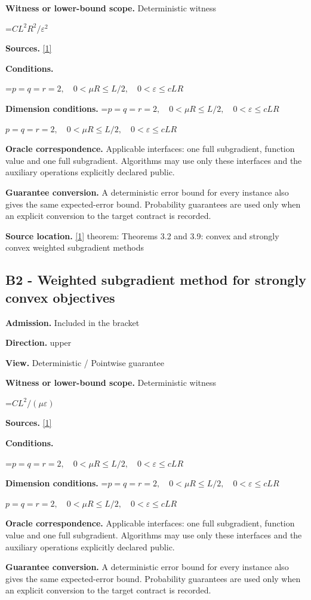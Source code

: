 \documentclass[10pt,a4paper]{article}
\newcommand{\AtlasMath}[1]{\par\begingroup\centering\setbox0=\hbox{$\displaystyle #1$}\ifdim\wd0>1.4\linewidth\typeout{ATLAS WIDE FORMULA: \the\wd0}\fi\ifdim\wd0>\linewidth\resizebox{\linewidth}{!}{\box0}\else\box0\fi\par\endgroup}
\newcommand{\AtlasInlineMath}[1]{\begingroup\setbox0=\hbox{$#1$}\ifdim\wd0>.4\linewidth\endgroup\AtlasMath{#1}\else\endgroup$#1$\fi}
\begin{document}
\textbf{Witness or lower-bound scope.} Deterministic witness

\AtlasMath{C L^2R^2/\varepsilon^2}
\textbf{Sources.} \href{https://arxiv.org/pdf/1405.4980}{[1]}

\textbf{Conditions.} 
\AtlasMath{p=q=r=2,\quad0<\mu R\le L/2,\quad0<\varepsilon\le cLR}


\textbf{Dimension conditions.} \AtlasInlineMath{p=q=r=2,\quad0<\mu R\le L/2,\quad0<\varepsilon\le cLR}

\textbf{Oracle correspondence.} Applicable interfaces: one full subgradient, function value and one full subgradient. Algorithms may use only these interfaces and the auxiliary operations explicitly declared public.

\textbf{Guarantee conversion.} A deterministic error bound for every instance also gives the same expected-error bound. Probability guarantees are used only when an explicit conversion to the target contract is recorded.

\textbf{Source location.} \href{https://arxiv.org/pdf/1405.4980}{[1]} theorem: Theorems 3.2 and 3.9: convex and strongly convex weighted subgradient methods

\subsection{B2 - Weighted subgradient method for strongly convex objectives}
\textbf{Admission.} Included in the bracket

\textbf{Direction.} upper

\textbf{View.} Deterministic / Pointwise guarantee

\textbf{Witness or lower-bound scope.} Deterministic witness

\AtlasMath{C L^2/(\mu\varepsilon)}
\textbf{Sources.} \href{https://arxiv.org/pdf/1405.4980}{[1]}

\textbf{Conditions.} 
\AtlasMath{p=q=r=2,\quad0<\mu R\le L/2,\quad0<\varepsilon\le cLR}


\textbf{Dimension conditions.} \AtlasInlineMath{p=q=r=2,\quad0<\mu R\le L/2,\quad0<\varepsilon\le cLR}

\textbf{Oracle correspondence.} Applicable interfaces: one full subgradient, function value and one full subgradient. Algorithms may use only these interfaces and the auxiliary operations explicitly declared public.

\textbf{Guarantee conversion.} A deterministic error bound for every instance also gives the same expected-error bound. Probability guarantees are used only when an explicit conversion to the target contract is recorded.
\end{document}
